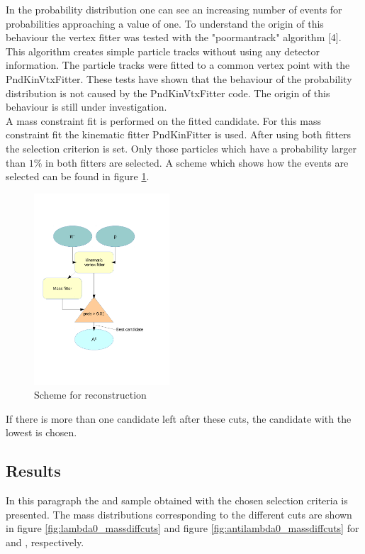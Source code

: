		In the probability distribution one can see an increasing number of events for probabilities approaching a value of one.
		To understand the origin of this behaviour the vertex fitter was tested with the "poormantrack" algorithm [4]. 
		This algorithm creates simple particle tracks without using any detector information.
        The particle tracks were fitted to a common vertex point with the PndKinVtxFitter.
        These tests have shown that the behaviour of the probability distribution is not caused by the PndKinVtxFitter code. 
        The origin of this behaviour is still under investigation.
		\vspace{11pt}\\
		A mass constraint fit is performed on the fitted candidate.
		For this mass constraint fit the kinematic fitter PndKinFitter is used.
		After using both fitters the selection criterion is set. 
		Only those particles which have a probability larger than $1\%$ in both fitters are selected.
		A scheme which shows how the events are selected can be found in figure \ref{fig:lambda_scheme}. 
		
		\begin{figure}
			\centering
				\includegraphics[width=0.45\textwidth]{./plots/combineLambda0.pdf}
			\caption{\propose Scheme for \lam reconstruction}
			\label{fig:lambda_scheme}
		\end{figure}
		
		If there is more than one candidate left after these cuts, the candidate with the lowest \chisq is chosen.
		
		
	\subsection*{Results}
		In this paragraph the \lam and \alam sample obtained with the chosen selection criteria is presented.
		The mass distributions corresponding to the different cuts are shown in figure \ref{fig:lambda0_massdiffcuts} 
		and figure \ref{fig:antilambda0_massdiffcuts} for \lam and \alam, respectively.
	
